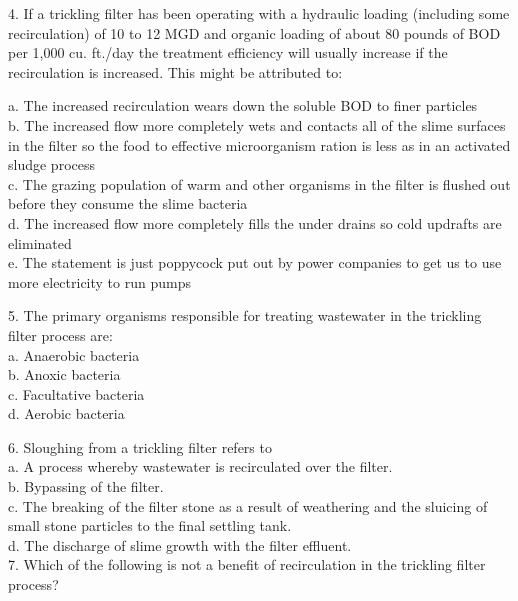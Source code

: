 \vspace{0.3cm}
4. If a trickling filter has been operating with a hydraulic loading (including some recirculation) of 10 to 12 MGD and organic loading of about 80 pounds of BOD per 1,000 cu. ft./day the treatment efficiency will usually increase if the recirculation is increased. This might be attributed to:

a. The increased recirculation wears down the soluble BOD to finer particles \\
b. The increased flow more completely wets and contacts all of the slime surfaces in the filter so the food to effective microorganism ration is less as in an activated sludge process \\
c. The grazing population of warm and other organisms in the filter is flushed out before they consume the slime bacteria \\
d. The increased flow more completely fills the under drains so cold updrafts are eliminated\\ 
e. The statement is just poppycock put out by power companies to get us to use more electricity to run pumps \\
\vspace{0.3cm}

5. The primary organisms responsible for treating wastewater in the trickling filter process are:\\

a. Anaerobic bacteria \\
b. Anoxic bacteria \\
c. Facultative bacteria \\
d. Aerobic bacteria \\
\vspace{0.3cm}

6. Sloughing from a trickling filter refers to\\

a. A process whereby wastewater is recirculated over the filter. \\
b. Bypassing of the filter. \\
c. The breaking of the filter stone as a result of weathering and the sluicing of small stone particles to the final settling tank. \\
d. The discharge of slime growth with the filter effluent. \\

\vspace{0.3cm}
7. Which of the following is not a benefit of recirculation in the trickling filter process?\\

